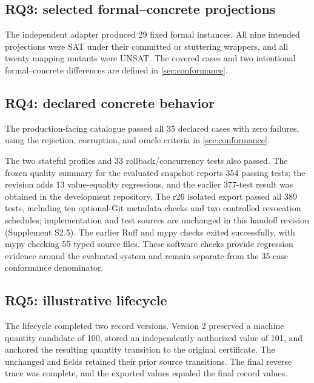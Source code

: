 \subsection{RQ3: selected formal--concrete projections}

The independent adapter produced 29 fixed formal instances. All nine intended projections were SAT under their committed or stuttering wrappers, and all twenty mapping mutants were UNSAT. The covered cases and two intentional formal--concrete differences are defined in \cref{sec:conformance}.

\subsection{RQ4: declared concrete behavior}

The production-facing catalogue passed all 35 declared cases with zero failures, using the rejection, corruption, and oracle criteria in \cref{sec:conformance}.

The two stateful profiles and 33 rollback/concurrency tests also passed. The frozen quality summary for the evaluated snapshot reports 354 passing tests; the revision adds 13 value-equality regressions, and the earlier 377-test result was obtained in the development repository. The r26 isolated export passed all 389 tests, including ten optional-Git metadata checks and two controlled revocation schedules; implementation and test sources are unchanged in this handoff revision (Supplement S2.5). The earlier Ruff and mypy checks exited successfully, with mypy checking 55 typed source files. These software checks provide regression evidence around the evaluated system and remain separate from the 35-case conformance denominator.



\subsection{RQ5: illustrative lifecycle}

The lifecycle completed two record versions. Version 2 preserved a machine quantity candidate of 100, stored an independently authorized value of 101, and anchored the resulting quantity transition to the original certificate. The unchanged  and  fields retained their prior source transitions. The final reverse trace was complete, and the exported values equaled the final record values.

